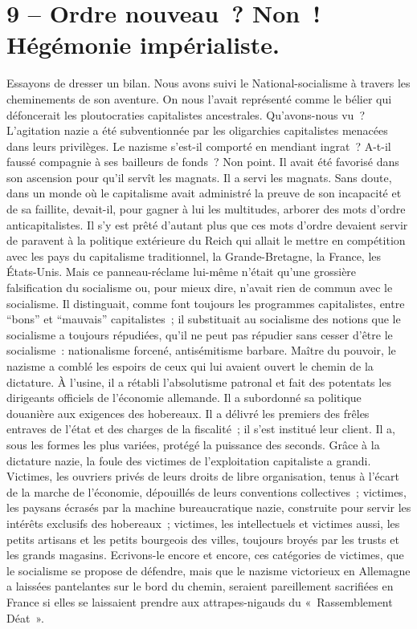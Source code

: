 \documentclass[french,twoside]{book} %
\newcommand\chapteropen{} %
\newcommand\chaptercont{} %
\begin{document}
\chapteropen
\chapter[9 – Ordre nouveau ? Non ! Hégémonie impérialiste.]{9 – Ordre nouveau ? Non ! Hégémonie impérialiste.}\renewcommand{\leftmark}{9 – Ordre nouveau ? Non ! Hégémonie impérialiste.}


\chaptercont
\noindent Essayons de dresser un bilan. Nous avons suivi le National-socialisme à travers les cheminements de son aventure. On nous l’avait représenté comme le bélier qui défoncerait les ploutocraties capitalistes ancestrales. Qu’avons-nous vu ? L’agitation nazie a été subventionnée par les oligarchies capitalistes menacées dans leurs privilèges. Le nazisme s’est-il comporté en mendiant ingrat ? A-t-il faussé compagnie à ses bailleurs de fonds ? Non point. Il avait été favorisé dans son ascension pour qu’il servît les magnats. Il a servi les magnats. Sans doute, dans un monde où le capitalisme avait administré la preuve de son incapacité et de sa faillite, devait-il, pour gagner à lui les multitudes, arborer des mots d’ordre anticapitalistes. Il s’y est prêté d’autant plus que ces mots d’ordre devaient servir de paravent à la politique extérieure du Reich qui allait le mettre en compétition avec les pays du capitalisme traditionnel, la Grande-Bretagne, la France, les États-Unis. Mais ce panneau-réclame lui-même n’était qu’une grossière falsification du socialisme ou, pour mieux dire, n’avait rien de commun avec le socialisme. Il distinguait, comme font toujours les programmes capitalistes, entre “bons” et “mauvais” capitalistes ; il substituait au socialisme des notions que le socialisme a toujours répudiées, qu’il ne peut pas répudier sans cesser d’être le socialisme : nationalisme forcené, antisémitisme barbare. Maître du pouvoir, le nazisme a comblé les espoirs de ceux qui lui avaient ouvert le chemin de la dictature. À l’usine, il a rétabli l’absolutisme patronal et fait des potentats les dirigeants officiels de l’économie allemande. Il a subordonné sa politique douanière aux exigences des hobereaux. Il a délivré les premiers des frêles entraves de l’état et des charges de la fiscalité ; il s’est institué leur client. Il a, sous les formes les plus variées, protégé la puissance des seconds. Grâce à la dictature nazie, la foule des victimes de l’exploitation capitaliste a grandi. Victimes, les ouvriers privés de leurs droits de libre organisation, tenus à l’écart de la marche de l’économie, dépouillés de leurs conventions collectives ; victimes, les paysans écrasés par la machine bureaucratique nazie, construite pour servir les intérêts exclusifs des hobereaux ; victimes, les intellectuels et victimes aussi, les petits artisans et les petits bourgeois des villes, toujours broyés par les trusts et les grands magasins. Ecrivons-le encore et encore, ces catégories de victimes, que le socialisme se propose de défendre, mais que le nazisme victorieux en Allemagne a laissées pantelantes sur le bord du chemin, seraient pareillement sacrifiées en France si elles se laissaient prendre aux attrapes-nigauds du « Rassemblement Déat ».\par
\end{document}
